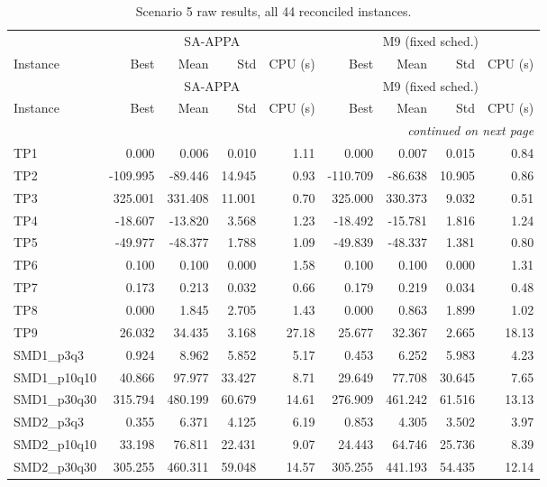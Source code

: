 \begingroup\scriptsize
\begin{longtable}{lrrrrrrrr}
\caption{Scenario 5 raw results, all 44 reconciled instances.}\label{tab:scenario5}\\
\toprule
 & \multicolumn{4}{c}{SA-APPA} & \multicolumn{4}{c}{M9 (fixed sched.)} \\
\cmidrule(lr){2-5} \cmidrule(lr){6-9}
Instance & Best & Mean & Std & CPU (s) & Best & Mean & Std & CPU (s) \\
\midrule
\endfirsthead
\toprule
 & \multicolumn{4}{c}{SA-APPA} & \multicolumn{4}{c}{M9 (fixed sched.)} \\
\cmidrule(lr){2-5} \cmidrule(lr){6-9}
Instance & Best & Mean & Std & CPU (s) & Best & Mean & Std & CPU (s) \\
\midrule
\endhead
\midrule\multicolumn{9}{r}{\emph{continued on next page}}\\\midrule
\endfoot
\bottomrule
\endlastfoot
TP1 & 0.000 & 0.006 & 0.010 & 1.11 & 0.000 & 0.007 & 0.015 & 0.84 \\
TP2 & -109.995 & -89.446 & 14.945 & 0.93 & -110.709 & -86.638 & 10.905 & 0.86 \\
TP3 & 325.001 & 331.408 & 11.001 & 0.70 & 325.000 & 330.373 & 9.032 & 0.51 \\
TP4 & -18.607 & -13.820 & 3.568 & 1.23 & -18.492 & -15.781 & 1.816 & 1.24 \\
TP5 & -49.977 & -48.377 & 1.788 & 1.09 & -49.839 & -48.337 & 1.381 & 0.80 \\
TP6 & 0.100 & 0.100 & 0.000 & 1.58 & 0.100 & 0.100 & 0.000 & 1.31 \\
TP7 & 0.173 & 0.213 & 0.032 & 0.66 & 0.179 & 0.219 & 0.034 & 0.48 \\
TP8 & 0.000 & 1.845 & 2.705 & 1.43 & 0.000 & 0.863 & 1.899 & 1.02 \\
TP9 & 26.032 & 34.435 & 3.168 & 27.18 & 25.677 & 32.367 & 2.665 & 18.13 \\
SMD1\_p3q3 & 0.924 & 8.962 & 5.852 & 5.17 & 0.453 & 6.252 & 5.983 & 4.23 \\
SMD1\_p10q10 & 40.866 & 97.977 & 33.427 & 8.71 & 29.649 & 77.708 & 30.645 & 7.65 \\
SMD1\_p30q30 & 315.794 & 480.199 & 60.679 & 14.61 & 276.909 & 461.242 & 61.516 & 13.13 \\
SMD2\_p3q3 & 0.355 & 6.371 & 4.125 & 6.19 & 0.853 & 4.305 & 3.502 & 3.97 \\
SMD2\_p10q10 & 33.198 & 76.811 & 22.431 & 9.07 & 24.443 & 64.746 & 25.736 & 8.39 \\
SMD2\_p30q30 & 305.255 & 460.311 & 59.048 & 14.57 & 305.255 & 441.193 & 54.435 & 12.14 \\

\end{longtable}

